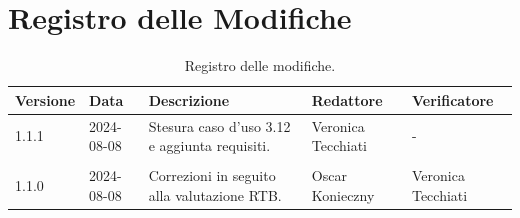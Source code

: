 \documentclass[8pt]{article}
\begin{document}
\section*{Registro delle Modifiche}
\begin{table}[ht!]	
	\centering
	\begin{tabular}{p{1.2cm} p{2cm} p{5cm} p{3cm} p{3cm}}
		\toprule
		\textbf{Versione}& \textbf{Data} & \textbf{Descrizione} & \textbf{Redattore} & \textbf{Verificatore} \\
		\midrule
                1.1.1 & 2024-08-08 & Stesura caso d'uso 3.12 e aggiunta requisiti. & Veronica Tecchiati & - \\\\
			1.1.0 & 2024-08-08 & Correzioni in seguito alla valutazione RTB. & Oscar Konieczny & Veronica Tecchiati
 		    \\ %
		\bottomrule
	\end{tabular}
	\caption{Registro delle modifiche.}
	\label{table:Registro delle modifiche}
\end{table}
\clearpage
\end{document}

